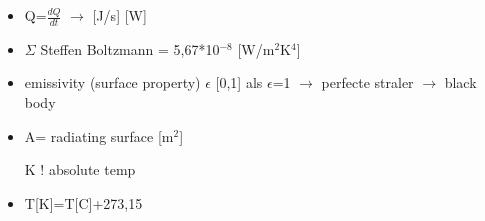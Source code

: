 \documentclass[12pt]{article}
\begin{document}
\begin{itemize}
    \item Q=$\frac{dQ}{dt}$ $\rightarrow$ [J/s] [W]
    \item $\Sigma$ Steffen Boltzmann = 5,67*10$^{-8}$ [W/m$^2$K$^4$]
    \item emissivity (surface property) $\epsilon$ [0,1] als $\epsilon$=1 $\rightarrow$ perfecte straler $\rightarrow$ black body 
    \item A= radiating surface [m$^2$]
    \item [K]! absolute temp 
    \item T[K]=T[\degree C]+273,15 
\end{itemize}
\end{document}
